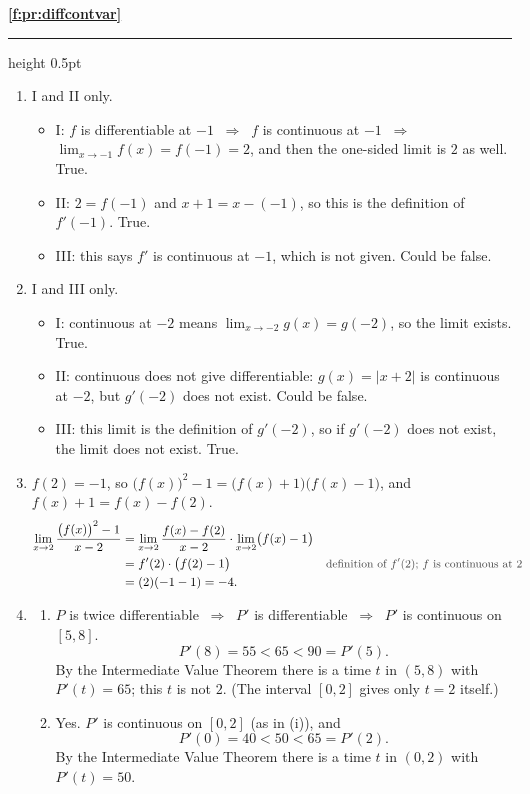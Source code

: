 \documentclass[11pt,a4paper]{article}
\newcommand{\solitem}[2]{%
 \par\addvspace{16pt}\Needspace{10\baselineskip}%
 {\large\bfseries \ref{#1}}\par\nobreak\vspace{2pt}%
 {\color{rulegray}\hrule height 0.5pt}\nobreak\vspace{7pt}%
 #2\par}
\newcommand{\why}[1]{\text{\small\color{darkgray}#1}}
\newcommand{\imp}{\ \Longrightarrow\ }
\begin{document}
\solitem{f:pr:diffcontvar}{%
\begin{enumerate}[label=(\alph*)]
 \item I and II only.
 \begin{itemize}
  \item I: $f$ is differentiable at $-1$ $\imp$ $f$ is continuous at $-1$ $\imp$ $\displaystyle\lim_{x\to-1}f(x)=f(-1)=2$, and then the one-sided limit is $2$ as well. True.
  \item II: $2=f(-1)$ and $x+1=x-(-1)$, so this is the definition of $f'(-1)$. True.
  \item III: this says $f'$ is continuous at $-1$, which is not given. Could be false.
 \end{itemize}
 \item I and III only.
 \begin{itemize}
  \item I: continuous at $-2$ means $\displaystyle\lim_{x\to-2}g(x)=g(-2)$, so the limit exists. True.
  \item II: continuous does not give differentiable: $g(x)=|x+2|$ is continuous at $-2$, but $g'(-2)$ does not exist. Could be false.
  \item III: this limit is the definition of $g'(-2)$, so if $g'(-2)$ does not exist, the limit does not exist. True.
 \end{itemize}
 \item $f(2)=-1$, so $\bigl(f(x)\bigr)^2-1=\bigl(f(x)+1\bigr)\bigl(f(x)-1\bigr)$, and $f(x)+1=f(x)-f(2)$.
 \begin{align*}
 \lim_{x\to2}\frac{\bigl(f(x)\bigr)^2-1}{x-2}&=\lim_{x\to2}\frac{f(x)-f(2)}{x-2}\cdot\lim_{x\to2}\bigl(f(x)-1\bigr)\\
 &=f'(2)\cdot\bigl(f(2)-1\bigr) &&\why{definition of $f'(2)$; $f$ is continuous at $2$}\\
 &=(2)(-1-1)=-4.
 \end{align*}
 \item
 \begin{enumerate}[label=(\roman*)]
  \item $P$ is twice differentiable $\imp$ $P'$ is differentiable $\imp$ $P'$ is continuous on $[5,8]$.
  \[
  P'(8)=55<65<90=P'(5).
  \]
  By the Intermediate Value Theorem there is a time $t$ in $(5,8)$ with $P'(t)=65$; this $t$ is not $2$. (The interval $[0,2]$ gives only $t=2$ itself.)
  \item Yes. $P'$ is continuous on $[0,2]$ (as in (i)), and
  \[
  P'(0)=40<50<65=P'(2).
  \]
  By the Intermediate Value Theorem there is a time $t$ in $(0,2)$ with $P'(t)=50$.
 \end{enumerate}
\end{enumerate}
}
\end{document}
